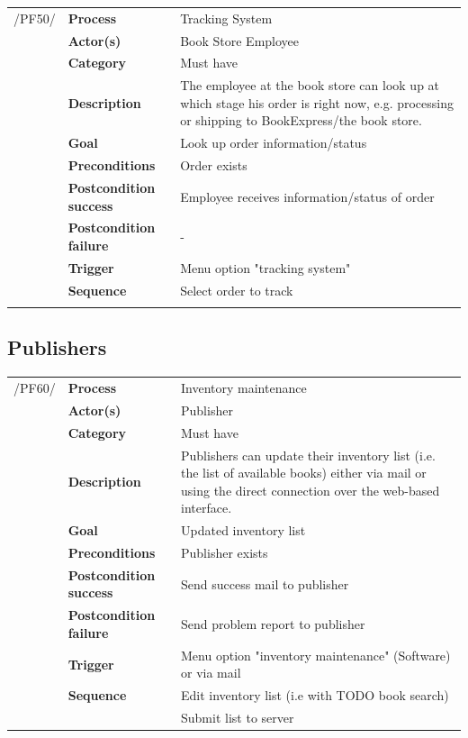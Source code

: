\documentclass[11pt,a4paper,oneside,svgnames]{report}
\begin{document}
\noindent
\begin{tabular}{p{1.5cm}p{3cm}p{8cm}}
/PF50/	& \textbf{Process} & Tracking System\\
		& \textbf{Actor(s)} & Book Store Employee\\
		& \textbf{Category} & Must have\\
		& \textbf{Description}	 & The employee at the book store can look up at which stage his order is right now, e.g. processing or shipping to BookExpress/the book store.\\
		& \textbf{Goal} & Look up order information/status\\
		& \textbf{Preconditions} & Order exists\\
		& \textbf{Postcondition success} & Employee receives information/status of order\\
		& \textbf{Postcondition failure} & -\\
		& \textbf{Trigger} & Menu option "tracking system"\\
		& \textbf{Sequence} & Select order to track\\
		
\hfill \\
\end{tabular}

\subsection{Publishers}

\noindent
\begin{tabular}{p{1.5cm}p{3cm}p{8cm}}
/PF60/	& \textbf{Process} & Inventory maintenance\\
		& \textbf{Actor(s)} & Publisher\\
		& \textbf{Category} & Must have\\
		& \textbf{Description}	 & Publishers can update their inventory list
(i.e. the list of available books) either via mail or using the direct connection over the web-based interface.\\
		& \textbf{Goal} & Updated inventory list\\
		& \textbf{Preconditions} & Publisher exists\\
		& \textbf{Postcondition success} & Send success mail to publisher\\
		& \textbf{Postcondition failure} & Send problem report to publisher\\
		& \textbf{Trigger} & Menu option "inventory maintenance" (Software) or via mail\\
		& \textbf{Sequence} & Edit inventory list (i.e with TODO book search)\\
		& & Submit list to server
		
\hfill \\
\end{tabular}
\end{document}
